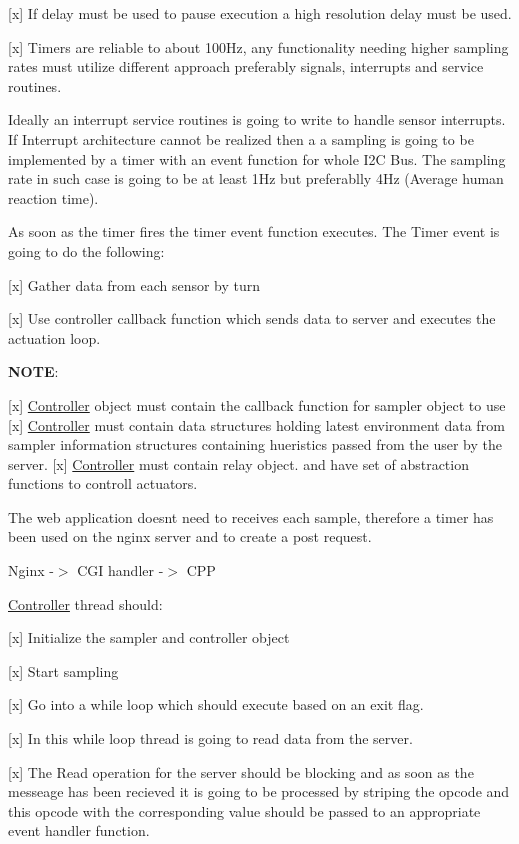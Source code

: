 \mbox{[}x\mbox{]} If delay must be used to pause execution a high resolution delay must be used.

\mbox{[}x\mbox{]} Timers are reliable to about 100\+Hz, any functionality needing higher sampling rates must utilize different approach preferably signals, interrupts and service routines.

Ideally an interrupt service routines is going to write to handle sensor interrupts. If Interrupt architecture cannot be realized then a a sampling is going to be implemented by a timer with an event function for whole I2C Bus. The sampling rate in such case is going to be at least 1\+Hz but preferablly 4\+Hz (Average human reaction time).

As soon as the timer fires the timer event function executes. The Timer event is going to do the following\+:
\begin{DoxyEnumerate}
\item \mbox{[}x\mbox{]} Gather data from each sensor by turn
\item \mbox{[}x\mbox{]} Use controller callback function which sends data to server and executes the actuation loop.
\end{DoxyEnumerate}

{\bfseries N\+O\+TE}\+:

\mbox{[}x\mbox{]} \hyperlink{classController}{Controller} object must contain the callback function for sampler object to use \mbox{[}x\mbox{]} \hyperlink{classController}{Controller} must contain data structures holding latest environment data from sampler information structures containing hueristics passed from the user by the server. \mbox{[}x\mbox{]} \hyperlink{classController}{Controller} must contain relay object. and have set of abstraction functions to controll actuators.

The web application doesn\textquotesingle{}t need to receives each sample, therefore a timer has been used on the nginx server and to create a post request.

Nginx -\/$>$ C\+GI handler -\/$>$ C\+PP

\hyperlink{classController}{Controller} thread should\+:
\begin{DoxyItemize}
\item \mbox{[}x\mbox{]} Initialize the sampler and controller object
\item \mbox{[}x\mbox{]} Start sampling
\item \mbox{[}x\mbox{]} Go into a while loop which should execute based on an exit flag.
\item \mbox{[}x\mbox{]} In this while loop thread is going to read data from the server.
\item \mbox{[}x\mbox{]} The Read operation for the server should be blocking and as soon as the messeage has been recieved it is going to be processed by striping the opcode and this opcode with the corresponding value should be passed to an appropriate event handler function.
\end{DoxyItemize}


